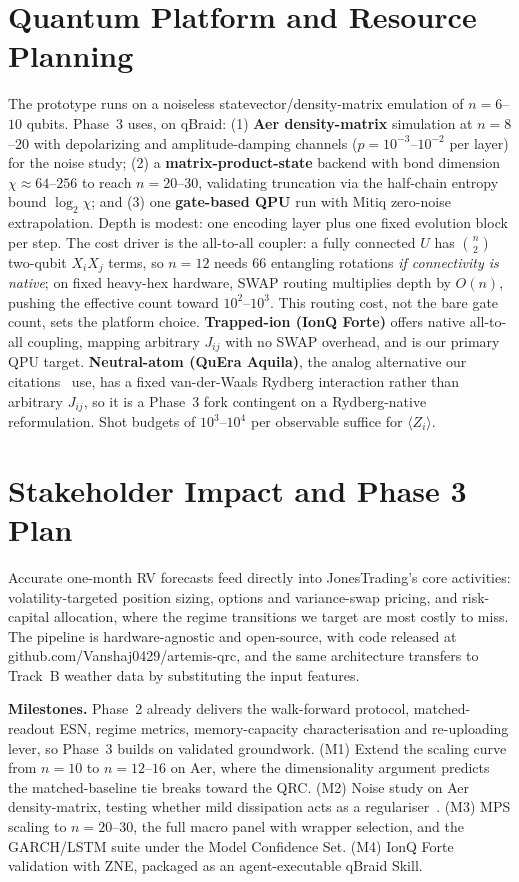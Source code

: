 \documentclass[11pt]{article}
\begin{document}
\section{Quantum Platform and Resource Planning}
The prototype runs on a noiseless statevector/density-matrix emulation of $n=6$--$10$ qubits. Phase~3 uses, on qBraid: (1) \textbf{Aer density-matrix} simulation at $n=8$--$20$ with depolarizing and amplitude-damping channels ($p=10^{-3}$--$10^{-2}$ per layer) for the noise study; (2) a \textbf{matrix-product-state} backend with bond dimension $\chi\approx 64$--$256$ to reach $n=20$--$30$, validating truncation via the half-chain entropy bound $\log_2\chi$; and (3) one \textbf{gate-based QPU} run with Mitiq zero-noise extrapolation. Depth is modest: one encoding layer plus one fixed evolution block per step. The cost driver is the all-to-all coupler: a fully connected $U$ has $\binom{n}{2}$ two-qubit $X_iX_j$ terms, so $n=12$ needs $66$ entangling rotations \emph{if connectivity is native}; on fixed heavy-hex hardware, SWAP routing multiplies depth by $O(n)$, pushing the effective count toward $10^2$--$10^3$. This routing cost, not the bare gate count, sets the platform choice. \textbf{Trapped-ion (IonQ Forte)} offers native all-to-all coupling, mapping arbitrary $J_{ij}$ with no SWAP overhead, and is our primary QPU target. \textbf{Neutral-atom (QuEra Aquila)}, the analog alternative our citations~\cite{kornjaca2024,hou2026} use, has a fixed van-der-Waals Rydberg interaction rather than arbitrary $J_{ij}$, so it is a Phase~3 fork contingent on a Rydberg-native reformulation. Shot budgets of $10^3$--$10^4$ per observable suffice for $\langle Z_i\rangle$.

\section{Stakeholder Impact and Phase 3 Plan}
Accurate one-month RV forecasts feed directly into JonesTrading's core activities: volatility-targeted position sizing, options and variance-swap pricing, and risk-capital allocation, where the regime transitions we target are most costly to miss. The pipeline is hardware-agnostic and open-source, with code released at github.com/Vanshaj0429/artemis-qrc, and the same architecture transfers to Track~B weather data by substituting the input features.

\textbf{Milestones.} Phase~2 already delivers the walk-forward protocol, matched-readout ESN, regime metrics, memory-capacity characterisation and re-uploading lever, so Phase~3 builds on validated groundwork. (M1) Extend the scaling curve from $n=10$ to $n=12$--$16$ on Aer, where the dimensionality argument predicts the matched-baseline tie breaks toward the QRC. (M2) Noise study on Aer density-matrix, testing whether mild dissipation acts as a regulariser~\cite{ahmed2025}. (M3) MPS scaling to $n=20$--$30$, the full macro panel with wrapper selection, and the GARCH/LSTM suite under the Model Confidence Set. (M4) IonQ Forte validation with ZNE, packaged as an agent-executable qBraid Skill.
\end{document}
